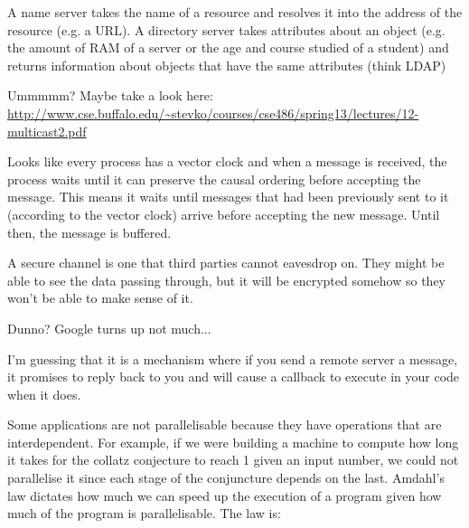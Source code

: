 
A name server takes the name of a resource and resolves it into the address of
the resource (e.g. a URL). A directory server takes attributes about an object
(e.g. the amount of RAM of a server or the age and course studied of a student)
and returns information about objects that have the same attributes (think LDAP)


Ummmmm? Maybe take a look here:
\url{http://www.cse.buffalo.edu/~stevko/courses/cse486/spring13/lectures/12-multicast2.pdf}

Looks like every process has a vector clock and when a message is received, the
process waits until it can preserve the causal ordering before accepting the
message. This means it waits until messages that had been previously sent to it
(according to the vector clock) arrive before accepting the new message. Until
then, the message is buffered.


A secure channel is one that third parties cannot eavesdrop on. They might be
able to see the data passing through, but it will be encrypted somehow so they
won’t be able to make sense of it.


Dunno? Google turns up not much...

I’m guessing that it is a mechanism where if you send a remote server a message,
it promises to reply back to you and will cause a callback to execute in your
code when it does.

\newpage


Some applications are not parallelisable because they have operations that are
interdependent. For example, if we were building a machine to compute how long
it takes for the collatz conjecture to reach 1 given an input number, we could
not parallelise it since each stage of the conjuncture depends on the last.
Amdahl’s law dictates how much we can speed up the execution of a program given
how much of the program is parallelisable. The law is:

